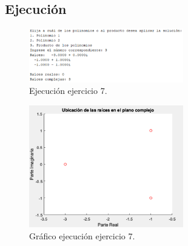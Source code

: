 \documentclass[a4paper, 12pt]{article}
\begin{document}
	\subsection{Ejecución}
	\begin{figure}[ht]
		\centering
		\includegraphics[width=0.6\textwidth]{figures/ejc7.png}
		\caption{Ejecución ejercicio 7.}
		\label{ejec7}
	\end{figure}
	\begin{figure}[ht]
		\centering
		\includegraphics[width=0.6\textwidth]{figures/graf7.png}
		\caption{Gráfico ejecución ejercicio 7.}
		\label{grafica7}
	\end{figure}
	\newpage
	
	\printbibliography
	
\end{document}

